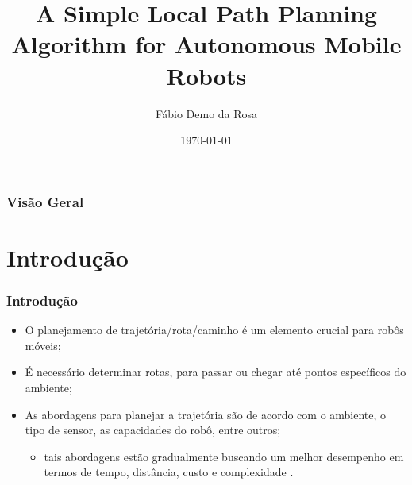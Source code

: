 \documentclass[xcolor=dvipsnames, aspectratio=169]{beamer}
\title[A Simple Local Path Planning Algorithm for Autonomous Mobile Robots]{A Simple Local Path Planning Algorithm for Autonomous Mobile Robots} %
\author[FDR]{Fábio Demo da Rosa} %
\institute[UFSM] %
{
Universidade Federal de Santa Maria \\ %
Pós-Graduação em Ciência da Computação \\
Disciplina de Robótica Móvel\\
\medskip
\textit{faberdemo@gmail.com} %
}
\date{\today} %
\begin{document}
\begin{frame}
\titlepage %
\end{frame}

\begin{frame}
\frametitle{Visão Geral} %
\tableofcontents %
\end{frame}


\section{Introdução}
\begin{frame}
  \frametitle{Introdução}
  \begin{itemize}
    \item O planejamento de trajetória/rota/caminho é um elemento crucial para robôs móveis;
    \item É necessário determinar rotas, para passar ou chegar até pontos específicos do ambiente;
    \item As abordagens para planejar a trajetória são de acordo com o ambiente, o tipo de sensor, as capacidades do robô, entre outros;
    \begin{itemize}
      \item tais abordagens estão gradualmente buscando um melhor desempenho em termos de tempo, distância, custo e complexidade \cite{buniyamin2011simple}.
    \end{itemize}
  \end{itemize}
\end{frame}

\end{document}
